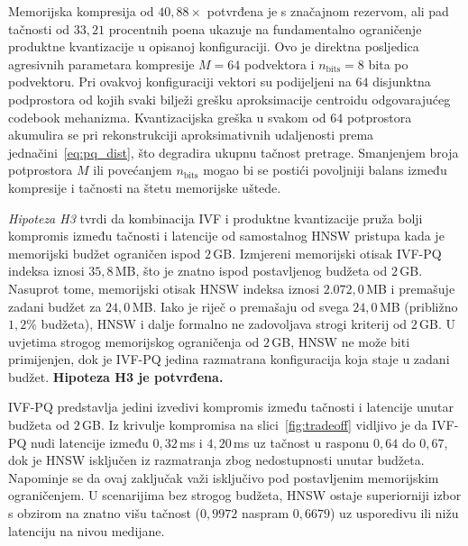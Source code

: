 Memorijska kompresija od $40{,}88\times$
potvrđena je s značajnom rezervom, ali pad
tačnosti od $33{,}21$ procentnih poena ukazuje
na fundamentalno ograničenje produktne
kvantizacije u opisanoj konfiguraciji.
Ovo je direktna posljedica agresivnih parametara
kompresije $M = 64$ podvektora i
$n_{\mathrm{bits}} = 8$ bita po podvektoru.
Pri ovakvoj konfiguraciji vektori su podijeljeni
na $64$ disjunktna podprostora od kojih svaki
bilježi grešku aproksimacije centroidu
odgovarajućeg \foreignlanguage{english}{codebook}
mehanizma. Kvantizacijska greška u svakom od
$64$ potprostora akumulira se pri rekonstrukciji
aproksimativnih udaljenosti prema
jednačini~\ref{eq:pq_dist}, što degradira
ukupnu tačnost pretrage.
Smanjenjem broja potprostora $M$ ili povećanjem
$n_{\mathrm{bits}}$ mogao bi se postići povoljniji
balans između kompresije i tačnosti na štetu
memorijske uštede.


\emph{Hipoteza H3} tvrdi da kombinacija
\foreignlanguage{english}{IVF} i produktne
kvantizacije pruža bolji kompromis između
tačnosti i latencije od samostalnog
\foreignlanguage{english}{HNSW} pristupa
kada je memorijski budžet ograničen ispod $2$\,GB.
Izmjereni memorijski otisak
\foreignlanguage{english}{IVF-PQ} indeksa iznosi
$35{,}8$\,MB, što je znatno ispod postavljenog
budžeta od $2$\,GB. Nasuprot tome, memorijski
otisak \foreignlanguage{english}{HNSW} indeksa
iznosi $2{.}072{,}0$\,MB i premašuje zadani
budžet za $24{,}0$\,MB.
Iako je riječ o premašaju od svega $24{,}0$\,MB
(približno $1{,}2\%$ budžeta),
\foreignlanguage{english}{HNSW} i dalje formalno
ne zadovoljava strogi kriterij od $2$\,GB.
U uvjetima strogog
memorijskog ograničenja od $2$\,GB,
\foreignlanguage{english}{HNSW} ne može biti
primijenjen, dok je \foreignlanguage{english}%
{IVF-PQ} jedina razmatrana konfiguracija koja
staje u zadani budžet.
\textbf{Hipoteza H3 je potvrđena.}

\foreignlanguage{english}{IVF-PQ} predstavlja
jedini izvedivi kompromis između tačnosti i
latencije unutar budžeta od $2$\,GB.
Iz krivulje kompromisa na
slici~\ref{fig:tradeoff} vidljivo je da
\foreignlanguage{english}{IVF-PQ} nudi
latencije između $0{,}32$\,ms i $4{,}20$\,ms
uz tačnost u rasponu $0{,}64$ do $0{,}67$,
dok je \foreignlanguage{english}{HNSW}
isključen iz razmatranja zbog nedostupnosti
unutar budžeta. Napominje se da ovaj zaključak
važi isključivo pod postavljenim memorijskim
ograničenjem. U scenarijima bez strogog
budžeta, \foreignlanguage{english}{HNSW}
ostaje superiorniji izbor s obzirom na
znatno višu tačnost ($0{,}9972$ naspram
$0{,}6679$) uz usporedivu ili nižu latenciju
na nivou medijane.
